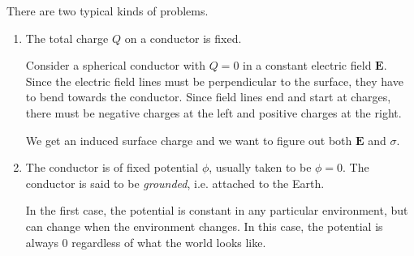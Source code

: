 \documentclass[a4paper]{article}
\begin{document}
There are two typical kinds of problems.
\begin{enumerate}
  \item The total charge $Q$ on a conductor is fixed. 
    \begin{eg}
      Consider a spherical conductor with $Q = 0$ in a constant electric field $\mathbf{E}$. Since the electric field lines must be perpendicular to the surface, they have to bend towards the conductor. Since field lines end and start at charges, there must be negative charges at the left and positive charges at the right.
      \begin{center}
      \end{center}
      We get an induced surface charge and we want to figure out both $\mathbf{E}$ and $\sigma$.
    \end{eg}
  \item The conductor is of fixed potential $\phi$, usually taken to be $\phi = 0$. The conductor is said to be \emph{grounded}, i.e. attached to the Earth.

    \note In the first case, the potential is constant in any particular environment, but can change when the environment changes. In this case, the potential is always 0 regardless of what the world looks like.

    \begin{eg}\leavevmode
      \begin{center}
      \end{center}


\end{eg}
\end{enumerate}
\end{document}
